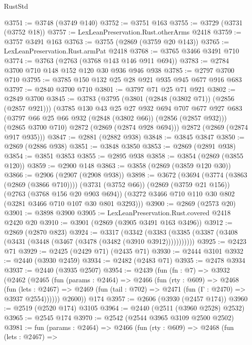 \begin{lexlean}{RustStd}
\begin{coremodule}
@3751 := @3748 (@3749 @140)
@3752 := @3751 @163
@3755 := @3729 (@3731 (@3752 @18))
@3757 := LexLeanPreservation.Rust.otherArms @2418
@3759 := @3757 @3491 @163
@3763 := @3755 (@2869 (@3759 @20 @143))
@3765 := LexLeanPreservation.Rust.armPat @2418
@3768 := @3765 @3466 @3491 @710
@3774 := @3763 (@2763 (@3768 @143 @146 @911 @694))
@3783 := @2784 @3700 @710 @148 @152 @120 @30 @936 @946 @938
@3785 := @2797 @3700 @710
@3795 := @3785 @150 @132 @25 @28 @921 @935 @945 @677 @916 @683
@3797 := @2840 @3700 @710
@3801 := @3797 @71 @25 @71 @921
@3802 := @2849 @3700
@3845 := @3783
    (@3795
      (@3801 (@2848 (@3802 @71)) (@2856 (@2857 @921)))
      (@3785
        @130
        @43
        @25
        @27
        @932
        @694
        @707
        @677
        @927
        @683
        (@3797 @66 @25 @66 @932 (@2848 (@3802 @66)) (@2856 (@2857 @932)))
        (@2865 @3700 @710)
        @2872
        (@2869 (@2874 @928 @694)))
      @2872
      (@2869 (@2874 @917 @935)))
@3847 := @2881 (@2882 @938)
@3848 := @3845 @3847
@3850 := @2869 (@2886 @938)
@3851 := @3848 @3850
@3853 := @2869 (@2891 @938)
@3854 := @3851 @3853
@3855 := @2895 @938
@3858 := @3854 (@2869 (@3855 @120))
@3859 := @2900 @148
@3863 := @3858 (@2869 (@3859 @120 @30))
@3866 := @2906 (@2907 (@2908 @938))
@3898 := @3672
    (@3694
      (@3774 (@3863 (@2869 (@3866 @710))))
      (@3731 (@3752 @66))
      (@2869 (@3759 @21 @156))
      (@2763 (@3768 @156 @20 @903 @694))
      (@3272 @3466 @710 @110 @30 @802 (@3281 @3466 @710 @107 @30 @801 @3293)))
@3900 := @2869 (@2573 @20)
@3901 := @3898 @3900
@3905 := LexLeanPreservation.Rust.covered @2418 @2420 @20
@3910 := @3901 (@2869 (@3905 @3491 @163 @3496))
@3912 := @2869 (@2870 @823)
@3924 := @3317
    (@3342 (@3383 (@3385 (@3387 (@3408 (@3431 (@3448 (@3467 (@3478 (@3482 (@3910 @3912)))))))))))
@3925 := @2423 @71
@3929 := @2425 (@2429 @71) (@2435 @71)
@3930 := @2444 @3101
@3932 := @2440 (@3930 @2459)
@3934 := @2482 (@2483 @71)
@3935 := @2478 @3934
@3937 := @2440 (@3935 @2507)
@3954 := @2439
    (fun (fn : @7) =>
    @3932
      (@2462
        (@2465
          (fun (params : @2464) =>
          @2466
            (fun (rty : @609) =>
            @2468
              (fun (lets : @2467) =>
              @2469 (fun (tail : @702) => @2471 (fun (Γ : @2470) => @3937 @2554))))))
        @2600))
    @174
@3957 := @2606 (@3930 (@2457 @174))
@3960 := @2519 (@2520 @174) @3105
@3964 := @2440 (@2511 (@3960 @2528) @2532)
@3965 := @2545 @174
@3970 := @2542 (@2544 @3965 @3109 @2500 @2502)
@3981 := fun (params : @2464) =>
  @2466
    (fun (rty : @609) =>
    @2468
      (fun (lets : @2467) =>

\end{coremodule}
\end{lexlean}

